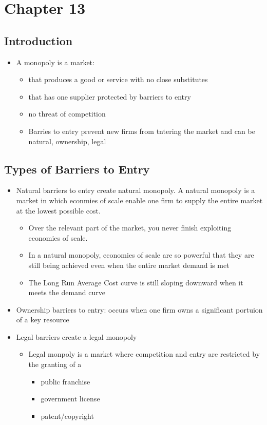 \documentclass[11pt]{article}
\author{Sudhan Chitgopkar}
\date{\today}
\title{}
\begin{document}
\tableofcontents

\section{Chapter 13}
\label{sec:org2d4ba7c}
\subsection{Introduction}
\label{sec:org5d3e04c}
\begin{itemize}
\item A monopoly is a market:
\begin{itemize}
\item that produces a good or service with no close substitutes
\item that has one supplier protected by barriers to entry
\item no threat of competition
\item Barries to entry prevent new firms from tntering the market and can be natural,    ownership, legal
\end{itemize}
\end{itemize}
\subsection{Types of Barriers to Entry}
\label{sec:org34d83c5}
\begin{itemize}
\item Natural barriers to entry create natural monopoly. A natural monopoly is a market in which econmies of scale enable one firm to supply the entire market at the lowest possible cost.
\begin{itemize}
\item Over the relevant part of the market, you never finish exploiting economies of scale.
\item In a natural monopoly, economies of scale are so powerful that they are still being achieved even when the entire market demand is met
\item The Long Run Average Cost curve is still sloping downward when it meets the demand curve
\end{itemize}
\item Ownership barriers to entry: occurs when one firm owns a significant portuion of a key resource
\item Legal barriers create a legal monopoly
\begin{itemize}
\item Legal monpoly is a market where competition and entry are restricted by the granting of a
\begin{itemize}
\item public franchise
\item government license
\item patent/copyright
\end{itemize}
\end{itemize}
\end{itemize}
\end{document}
